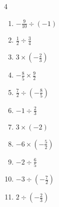 \begin{multicols}{4}
\begin{enumerate}

  \item $\displaystyle -\frac{9}{10}\div{}\left(-1\right)$


  \item $\displaystyle \frac{1}{2}\div{}\frac{3}{4}$


  \item $\displaystyle 3\times{}\left(-\frac{2}{3}\right)$

        \phantom{$\displaystyle =-2$}

  \item $\displaystyle -\frac{8}{5}\times{}\frac{9}{2}$


  \item $\displaystyle \frac{7}{2}\div{}\left(-\frac{8}{5}\right)$


  \item $\displaystyle -1\div{}\frac{2}{3}$


\columnbreak %

\resetques

  \item $\displaystyle 3\times{}\left(-2\right)$

        \phantom{$\displaystyle =-6$}

  \item $\displaystyle -6\times{}\left(-\frac{5}{2}\right)$

        \phantom{$\displaystyle =15$}

  \item $\displaystyle -2\div{}\frac{6}{5}$


  \item $\displaystyle -3\div{}\left(-\frac{7}{2}\right)$


  \item $\displaystyle 2\div{}\left(-\frac{2}{3}\right)$

        \phantom{$\displaystyle =-3$}


\end{enumerate}
\end{multicols}
